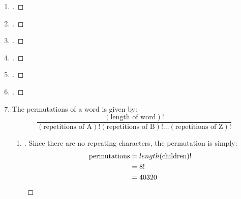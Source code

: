 \documentclass[paper=usletter, fontsize=12pt]{article}
\begin{document}
\begin{enumerate}
        \item
        \begin{proof}[\unskip\nopunct]
        \end{proof}
        \vspace{0.2in}

        \item
        \begin{proof}[\unskip\nopunct]
        \end{proof}
        \vspace{0.2in}

        \item
        \begin{proof}[\unskip\nopunct]
        \end{proof}
        \vspace{0.2in}

        \item
        \begin{proof}[\unskip\nopunct]
        \end{proof}
        \vspace{0.2in}

        \item
        \begin{proof}[\unskip\nopunct]
        \end{proof}
        \vspace{0.2in}

        \item
        \begin{proof}[\unskip\nopunct]
        \end{proof}
        \vspace{0.2in}

        \item
        The permutations of a word is given by:
        \begin{equation*}
            \frac{(\text{length of word})!}{(\text{repetitions of A})!(\text{repetitions of B})!\ldots (\text{repetitions of Z})!}
        \end{equation*}
        \begin{enumerate}

            \item
            \begin{proof}[\unskip\nopunct]
                Since there are no repeating characters, the permutation is
                simply:
                \begin{align*}
                    \text{permutations} & = length(\text{children})! \\
                    & = 8! \\
                    & = 40320 \qedhere
                \end{align*}
            \end{proof}
            \vspace{0.2in}


\end{enumerate}
\end{enumerate}
\end{document}
